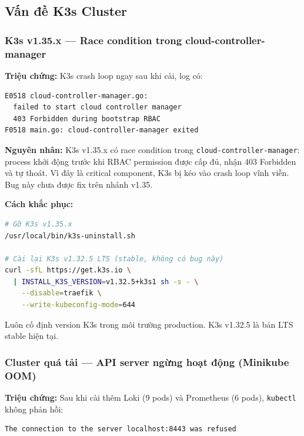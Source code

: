 \subsection{Vấn đề K3s Cluster}

\subsubsection{K3s v1.35.x — Race condition trong cloud-controller-manager}

\textbf{Triệu chứng:} K3s crash loop ngay sau khi cài, log có:

\begin{lstlisting}[language=bash]
E0518 cloud-controller-manager.go:
  failed to start cloud controller manager
  403 Forbidden during bootstrap RBAC
F0518 main.go: cloud-controller-manager exited
\end{lstlisting}

\textbf{Nguyên nhân:} K3s v1.35.x có race condition trong \texttt{cloud-controller-manager}: process khởi động trước khi RBAC permission được cấp đủ, nhận 403 Forbidden và tự thoát. Vì đây là critical component, K3s bị kéo vào crash loop vĩnh viễn. Bug này chưa được fix trên nhánh v1.35.

\textbf{Cách khắc phục:}

\begin{lstlisting}[language=bash]
# Gỡ K3s v1.35.x
/usr/local/bin/k3s-uninstall.sh

# Cài lại K3s v1.32.5 LTS (stable, không có bug này)
curl -sfL https://get.k3s.io \
  | INSTALL_K3S_VERSION=v1.32.5+k3s1 sh -s - \
    --disable=traefik \
    --write-kubeconfig-mode=644
\end{lstlisting}

Luôn cố định version K3s trong môi trường production. K3s v1.32.5 là bản LTS stable hiện tại.

\subsubsection{Cluster quá tải — API server ngừng hoạt động (Minikube OOM)}

\textbf{Triệu chứng:} Sau khi cài thêm Loki (9 pods) và Prometheus (6 pods), \texttt{kubectl} không phản hồi:

\begin{lstlisting}[language=bash]
The connection to the server localhost:8443 was refused
\end{lstlisting}

